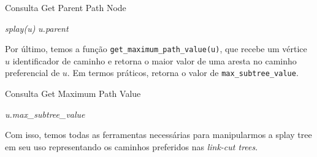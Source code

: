 \begin{algorithm}[h!]
    \caption{Consulta Get Parent Path Node}\label{splay:get-parent-path}
    \begin{algorithmic}
        \State \emph{splay(u)}
        \State \Return \emph{u.parent}
        \EndFunction
    \end{algorithmic}
\end{algorithm}

Por último, temos a função \texttt{get\_maximum\_path\_value(u)}, que recebe um vértice $u$ identificador de caminho e retorna o maior valor de uma aresta no caminho preferencial de $u$. Em termos práticos, retorna o valor de \texttt{max\_subtree\_value}.

\begin{algorithm}[h!]
    \caption{Consulta Get Maximum Path Value}\label{splay:get-maximum-value}
    \begin{algorithmic}
        \State \Return \emph{u.max\_subtree\_value}
        \EndFunction
    \end{algorithmic}
\end{algorithm}

Com isso, temos todas as ferramentas necessárias para manipularmos a splay tree em seu uso representando os caminhos preferidos nas \emph{link-cut trees}.